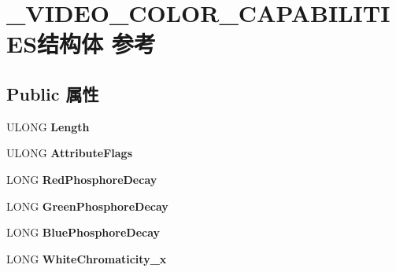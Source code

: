 \hypertarget{struct___v_i_d_e_o___c_o_l_o_r___c_a_p_a_b_i_l_i_t_i_e_s}{}\section{\+\_\+\+V\+I\+D\+E\+O\+\_\+\+C\+O\+L\+O\+R\+\_\+\+C\+A\+P\+A\+B\+I\+L\+I\+T\+I\+E\+S结构体 参考}
\label{struct___v_i_d_e_o___c_o_l_o_r___c_a_p_a_b_i_l_i_t_i_e_s}
\subsection*{Public 属性}
\begin{DoxyCompactItemize}
\item 
\mbox{\label{struct___v_i_d_e_o___c_o_l_o_r___c_a_p_a_b_i_l_i_t_i_e_s_af7ea9b510c533cfc6863a7e9b8ff2aa4}} 
U\+L\+O\+NG {\bfseries Length}
\item 
\mbox{\label{struct___v_i_d_e_o___c_o_l_o_r___c_a_p_a_b_i_l_i_t_i_e_s_a0de417902570284b3268cab75efb80cb}} 
U\+L\+O\+NG {\bfseries Attribute\+Flags}
\item 
\mbox{\label{struct___v_i_d_e_o___c_o_l_o_r___c_a_p_a_b_i_l_i_t_i_e_s_a15a95356ba0acf72bc3b0628e75041ba}} 
L\+O\+NG {\bfseries Red\+Phosphore\+Decay}
\item 
\mbox{\label{struct___v_i_d_e_o___c_o_l_o_r___c_a_p_a_b_i_l_i_t_i_e_s_acf258a8ca3617bab6c0c90e05b5c9310}} 
L\+O\+NG {\bfseries Green\+Phosphore\+Decay}
\item 
\mbox{\label{struct___v_i_d_e_o___c_o_l_o_r___c_a_p_a_b_i_l_i_t_i_e_s_ac7311bfac74263b0a4ee74554fe75c78}} 
L\+O\+NG {\bfseries Blue\+Phosphore\+Decay}
\item 
\mbox{\label{struct___v_i_d_e_o___c_o_l_o_r___c_a_p_a_b_i_l_i_t_i_e_s_a0cda86b7b16ddbd94d5fcc16d21fe0cf}} 
L\+O\+NG {\bfseries White\+Chromaticity\+\_\+x}

\end{DoxyCompactItemize}
